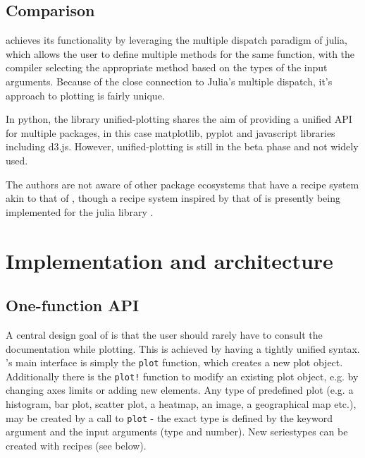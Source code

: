 \subsection*{Comparison}
\Plots achieves its functionality by leveraging the multiple dispatch paradigm of julia, which allows the user to define multiple methods for the same function, with the compiler selecting the appropriate method based on the types of the input arguments.
Because of the close connection to Julia's multiple dispatch, it's approach to plotting is fairly unique.

In python, the library unified-plotting\cite{UnifiedPlottingUnifiedplotting} shares the aim of providing a unified API for multiple packages, in this case matplotlib\cite{Hunter:2007}, pyplot and javascript libraries including d3.js\cite{bostockD3JsDataDriven}.
However, unified-plotting is still in the beta phase and not widely used.

The authors are not aware of other package ecosystems that have a recipe system akin to that of \Plots{}, though a recipe system inspired by that of \Plots{} is presently being implemented for the julia library \cite{danischMakieJlFlexible2021}.

\section*{Implementation and architecture}


\subsection*{One-function API\footnotemark}

A central design goal of \Plots is that the user should rarely have to consult the documentation while plotting.
This is achieved by having a tightly unified syntax.
\Plots's main interface is simply the \texttt{plot} function, which creates a new plot object.
Additionally there is the \texttt{plot!} function to modify an existing plot object, e.g. by changing axes limits or adding new elements.
Any type of predefined plot (e.g. a histogram, bar plot, scatter plot, a heatmap, an image, a geographical map etc.), may be created by a call to \texttt{plot} - the exact type is defined by the keyword argument  and the input arguments (type and number).
New seriestypes can be created with recipes (see below).

